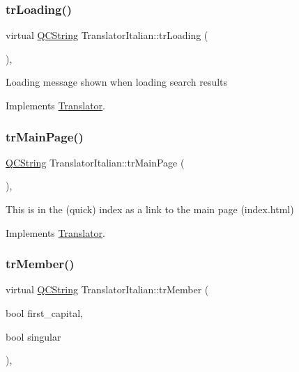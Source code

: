 \subsubsection{\texorpdfstring{trLoading()}{trLoading()}}
{\footnotesize\ttfamily virtual \mbox{\hyperlink{class_q_c_string}{Q\+C\+String}} Translator\+Italian\+::tr\+Loading (\begin{DoxyParamCaption}{ }\end{DoxyParamCaption})\hspace{0.3cm}{\ttfamily [inline]}, {\ttfamily [virtual]}}

Loading message shown when loading search results 

Implements \mbox{\hyperlink{class_translator}{Translator}}.

\mbox{\label{class_translator_italian_a49d20e0dd3406a6ff03a7d6a4f265852}} 
\subsubsection{\texorpdfstring{trMainPage()}{trMainPage()}}
{\footnotesize\ttfamily \mbox{\hyperlink{class_q_c_string}{Q\+C\+String}} Translator\+Italian\+::tr\+Main\+Page (\begin{DoxyParamCaption}{ }\end{DoxyParamCaption})\hspace{0.3cm}{\ttfamily [inline]}, {\ttfamily [virtual]}}

This is in the (quick) index as a link to the main page (index.\+html) 

Implements \mbox{\hyperlink{class_translator}{Translator}}.

\mbox{\label{class_translator_italian_a6df842fcb80263a781aff7305bf71763}} 
\subsubsection{\texorpdfstring{trMember()}{trMember()}}
{\footnotesize\ttfamily virtual \mbox{\hyperlink{class_q_c_string}{Q\+C\+String}} Translator\+Italian\+::tr\+Member (\begin{DoxyParamCaption}\item[{bool}]{first\+\_\+capital,  }\item[{bool}]{singular }\end{DoxyParamCaption})\hspace{0.3cm}{\ttfamily [inline]}, {\ttfamily [virtual]}}

